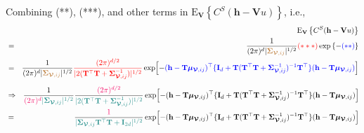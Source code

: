 \documentclass[12pt]{article}
\newcommand{\0}{\mathbf{0}}
\begin{document}
Combining (**), (***), and other terms in $\text{E}_{\mathbf{V}} \left\{ C^S( \mathbf{h} - \mathbf{V}u ) \right\}$, i.e.,
\begin{eqnarray*}
& & \text{E}_{\mathbf{V}} \left\{ C^S( \mathbf{h} - \mathbf{V}u ) \right\} \\
& = & \frac{1}{(2 \pi)^d | \textcolor{brown}{\boldsymbol{\Sigma}_{\boldsymbol{\mathcal{V}}, ij}} |^{1/2}} \textcolor{red}{(***)} \exp\left\{ - \textcolor{blue}{(**)} \right\} \\
& = & \frac{1}{(2 \pi)^d | \textcolor{brown}{\boldsymbol{\Sigma}_{\boldsymbol{\mathcal{V}}, ij}} |^{1/2}} \textcolor{red}{ \frac{ (2 \pi)^{d / 2} }{| 2 ( \mathbf{T}^{\top} \mathbf{T} + \boldsymbol{\Sigma}_{\boldsymbol{\mathcal{V}}, ij}^{-1} ) |^{1/2}}} \exp[ - \textcolor{blue}{( \mathbf{h} -  \mathbf{T}\boldsymbol{\mu}_{\boldsymbol{\mathcal{V}}, ij} )^{\top}  \{ \mathbf{I}_d + \mathbf{T} ( \mathbf{T}^{\top} \mathbf{T} + \boldsymbol{\Sigma}_{\boldsymbol{\mathcal{V}}, ij}^{-1} )^{-1} \mathbf{T}^{\top} \} ( \mathbf{h} -  \mathbf{T}\boldsymbol{\mu}_{\boldsymbol{\mathcal{V}}, ij} )} ] \\
\end{eqnarray*}
\begin{eqnarray*}
& \Rightarrow & \frac{1}{\textcolor{barbiepink}{(2 \pi)^d}  \textcolor{kaustgreen}{|\boldsymbol{\Sigma}_{\boldsymbol{\mathcal{V}}, ij}|^{1/2}}}  \frac{ \textcolor{barbiepink}{(2 \pi)^{d / 2} }}{\textcolor{kaustgreen}{ | 2 ( \mathbf{T}^{\top} \mathbf{T} + \boldsymbol{\Sigma}_{\boldsymbol{\mathcal{V}}, ij}^{-1})|^{1/2}}} \exp [ - ( \mathbf{h} -  \mathbf{T}\boldsymbol{\mu}_{\boldsymbol{\mathcal{V}}, ij} )^{\top}  \{ \mathbf{I}_d + \mathbf{T} ( \mathbf{T}^{\top} \mathbf{T} + \boldsymbol{\Sigma}_{\boldsymbol{\mathcal{V}}, ij}^{-1} )^{-1} \mathbf{T}^{\top} \} ( \mathbf{h} -  \mathbf{T}\boldsymbol{\mu}_{\boldsymbol{\mathcal{V}}, ij} ) ] \\
& = & \frac{ \textcolor{barbiepink}{1}}{\textcolor{kaustgreen}{{ | \boldsymbol{\Sigma}_{\boldsymbol{\mathcal{V}}, ij} \mathbf{T}^{\top} \mathbf{T} +  \mathbf{I}_{2 d} |^{1/2}}}} \exp [ - ( \mathbf{h} -  \mathbf{T}\boldsymbol{\mu}_{\boldsymbol{\mathcal{V}}, ij} )^{\top}  \{ \mathbf{I}_d + \mathbf{T} ( \mathbf{T}^{\top} \mathbf{T} + \boldsymbol{\Sigma}_{\boldsymbol{\mathcal{V}}, ij}^{-1} )^{-1} \mathbf{T}^{\top} \} ( \mathbf{h} -  \mathbf{T}\boldsymbol{\mu}_{\boldsymbol{\mathcal{V}}, ij} ) ]
\end{eqnarray*}
\end{document}
